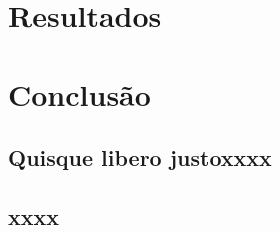 \documentclass[
	12pt,				%
	openright,			%
	oneside,			%
	a4paper,			%
	chapter=TITLE,		%
	english,			%
	french,				%
	spanish,			%
	brazil				%
	]{abntex2}
\theoremstyle{definition}
\begin{document}
\chapter{Resultados}
\label{cap:resultados}


\chapter{Conclusão}
\label{conclusao}


\postextual





\begin{apendicesenv}

	\partapendices

\chapter{Quisque libero justoxxxx}



\end{apendicesenv}


\begin{anexosenv}

	\partanexos

    \chapter{xxxx}



\end{anexosenv}
\end{document}
